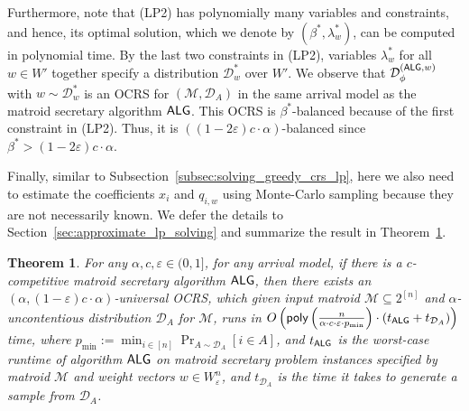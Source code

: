 \documentclass[11pt]{article}
\newcommand{\D}{\mathcal D}
\newcommand{\M}{{\mathcal M}}
\newcommand{\alg}{\textnormal{\sffamily ALG}}
\newcommand{\eps}{\varepsilon}
\newcommand{\poly}{\textnormal{\sffamily poly}}
\newtheorem{theorem}{Theorem}[section]
\begin{document}
Furthermore, note that (LP2) has polynomially many variables and constraints, and hence, its optimal solution, which we denote by $(\beta^*,\lambda^*_w)$, can be computed in polynomial time. By the last two constraints in (LP2), variables $\lambda^*_{w}$ for all $w\in W'$ together specify a distribution $\D_{w}^*$ over $W'$. We observe that $\D_{\phi}^{(\alg,w)}$ with $w\sim\D_{w}^*$ is an OCRS for $(\M,\D_A)$ in the same arrival model as the matroid secretary algorithm $\alg$. This OCRS is $\beta^*$-balanced because of the first constraint in (LP2). Thus, it is $((1-2\eps)c\cdot\alpha)$-balanced since $\beta^*>(1-2\eps)c\cdot\alpha$.

Finally, similar to Subsection~\ref{subsec:solving_greedy_crs_lp}, here we also need to estimate the coefficients $x_i$ and $q_{i,w}$ using Monte-Carlo sampling because they are not necessarily known. We defer the details to Section~\ref{sec:approximate_lp_solving} and summarize the result in Theorem~\ref{thm:secretary_to_ocrs}.
\begin{theorem}\label{thm:secretary_to_ocrs}
For any $\alpha,c,\eps\in(0,1]$, for any arrival model, if there is a $c$-competitive matroid secretary algorithm $\alg$, then there exists an $(\alpha,(1-\eps)c\cdot\alpha)$-universal OCRS, which given input matroid $\M\subseteq2^{[n]}$ and $\alpha$-uncontentious distribution $\D_A$ for $\M$, runs in $O\left(\poly\left(\frac{n}{\alpha\cdot c\cdot\eps\cdot p_{\min}}\right)\cdot(t_{\alg}+t_{\D_A})\right)$ time, where $p_{\min}:=\min_{i\in[n]}\Pr_{A\sim\D_A}[i\in A]$, and $t_{\alg}$ is the worst-case runtime of algorithm $\alg$ on matroid secretary problem instances specified by matroid $\M$ and weight vectors $w\in W_{\eps}^n$, and $t_{\D_A}$ is the time it takes to generate a sample from $\D_A$.
\end{theorem} 


\appendix
\end{document}
